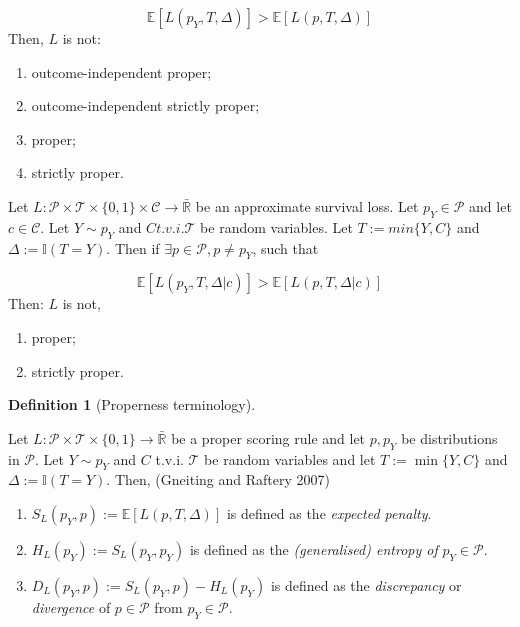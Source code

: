 \documentclass[
  letterpaper,
]{scrbook}
\providecommand{\tightlist}{%
  \setlength{\itemsep}{0pt}\setlength{\parskip}{0pt}}\usepackage{longtable,booktabs,array}
\theoremstyle{plain}
\theoremstyle{definition}
\newtheorem{definition}{Definition}[chapter]
\theoremstyle{remark}
\begin{document}
\[
\mathbb{E}[L(p_Y, T, \Delta)] > \mathbb{E}[L(p, T, \Delta)]
\] Then, \(L\) is not:

\begin{enumerate}
\def\labelenumi{\roman{enumi}.}
\tightlist
\item
  outcome-independent proper;
\item
  outcome-independent strictly proper;
\item
  proper;
\item
  strictly proper.
\end{enumerate}

\leavevmode{}%
\label{lem:approx_proper_relate} Let
\(L: \mathcal{P}\times \mathcal{T}\times \{0,1\}\times \mathcal{C}\rightarrow \bar{\mathbb{R}}\)
be an approximate survival loss. Let \(p_Y \in \mathcal{P}\) and let
\(c \in \mathcal{C}\). Let \(Y \sim p_Y\) and \(C t.v.i. \mathcal{T}\)
be random variables. Let \(T := min\{Y,C\}\) and
\(\Delta := \mathbb{I}(T=Y)\). Then if
\(\exists p \in \mathcal{P}, p \neq p_Y\), such that

\[
\mathbb{E}[L(p_Y, T, \Delta|c)] > \mathbb{E}[L(p, T, \Delta|c)]
\]\mbox{} Then: \(L\) is not,

\begin{enumerate}
\def\labelenumi{\roman{enumi}.}
\tightlist
\item
  proper;
\item
  strictly proper.
\end{enumerate}

\leavevmode{}%
\begin{definition}[Properness terminology]\label{def-proper-terms}

Let
\(L: \mathcal{P}\times \mathcal{T}\times \{0,1\}\rightarrow \bar{\mathbb{R}}\)
be a proper scoring rule and let \(p,p_Y\) be distributions in
\(\mathcal{P}\). Let \(Y \sim p_Y\) and \(C\) t.v.i. \(\mathcal{T}\) be
random variables and let \(T := \min\{Y,C\}\) and
\(\Delta := \mathbb{I}(T=Y)\). Then, (Gneiting and Raftery 2007)

\begin{enumerate}
\def\labelenumi{\roman{enumi}.}
\tightlist
\item
  \(S_L(p_Y, p) := \mathbb{E}[L(p, T, \Delta)]\) is defined as the
  \emph{expected penalty}.
\item
  \(H_L(p_Y) := S_L(p_Y, p_Y)\) is defined as the \emph{(generalised)
  entropy of} \(p_Y \in \mathcal{P}\).
\item
  \(D_L(p_Y, p) := S_L(p_Y, p) - H_L(p_Y)\) is defined as the
  \emph{discrepancy} or \emph{divergence} of \(p \in \mathcal{P}\) from
  \(p_Y \in \mathcal{P}\).
\end{enumerate}

\end{definition}
\end{document}

